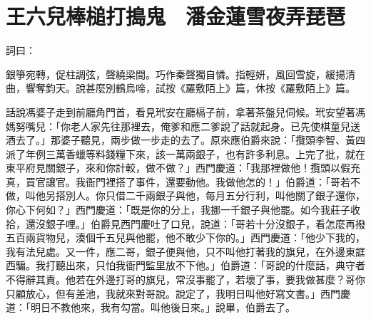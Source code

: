%

\chapter{王六兒棒槌打搗鬼　潘金蓮雪夜弄琵琶}

詞曰：

銀箏宛轉，促柱調弦，聲繞梁間。巧作秦聲獨自憐。指輕妍，風回雪旋，緩揚清曲，響奪鈞天。說甚麼別鶴烏啼，試按《羅敷陌上》篇，休按《羅敷陌上》篇。

話說馮婆子走到前廳角門首，看見玳安在廳槅子前，拿著茶盤兒伺候。玳安望著馮媽努嘴兒：「你老人家先往那裡去，俺爹和應二爹說了話就起身。已先使棋童兒送酒去了。」那婆子聽見，兩步做一步走的去了。原來應伯爵來說：「攬頭李智、黃四派了年例三萬香蠟等料錢糧下來，該一萬兩銀子，也有許多利息。上完了批，就在東平府見關銀子，來和你計較，做不做？」西門慶道：「我那裡做他！攬頭以假充真，買官讓官。我衙門裡搭了事件，還要動他。我做他怎的！」伯爵道：「哥若不做，叫他另搭別人。你只借二千兩銀子與他，每月五分行利，叫他關了銀子還你，你心下何如？」西門慶道：「既是你的分上，我挪一千銀子與他罷。如今我莊子收拾，還沒銀子哩。」伯爵見西門慶吐了口兒，說道：「哥若十分沒銀子，看怎麼再撥五百兩貨物兒，湊個千五兒與他罷，他不敢少下你的。」西門慶道：「他少下我的，我有法兒處。又一件，應二哥，銀子便與他，只不叫他打著我的旗兒，在外邊東誆西騙。我打聽出來，只怕我衙門監里放不下他。」伯爵道：「哥說的什麼話，典守者不得辭其責。他若在外邊打哥的旗兒，常沒事罷了，若壞了事，要我做甚麼？哥你只顧放心，但有差池，我就來對哥說。說定了，我明日叫他好寫文書。」西門慶道：「明日不教他來，我有勾當。叫他後日來。」說畢，伯爵去了。

